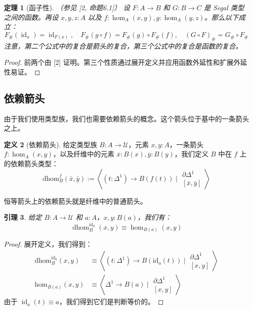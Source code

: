 \documentclass{ctexrep}
\theoremstyle{plain}
\newtheorem{theorem}{定理}[section]
\newtheorem{lemma}[theorem]{引理}
\theoremstyle{definition}
\newtheorem{definition}[theorem]{定义}
\theoremstyle{remark}
\theoremstyle{definition}
\theoremstyle{definition}
\theoremstyle{definition}
\newcommand{\id}{\operatorname{id}}
\newcommand{\UU}{\mathcal{U}}
\newcommand{\dhom}{\operatorname{dhom}}
\begin{document}
\begin{theorem}[函子性]（参见 [2, 命题6.1]）
设 $F:A\to B$ 和 $G:B\to C$ 是 Segal 类型之间的函数。再设 $x,y,z:A$ 以及 $f:\hom_A(x,y), g:\hom_A(y,z)$。那么以下成立：
\[
F_{\#}(\id_x) = \id_{F(x)}, \quad F_{\#}(g\circ f) = F_{\#}(g)\circ F_{\#}(f), \quad (G\circ F)_{\#} = G_{\#}\circ F_{\#}
\]
注意，第二个公式中的复合是箭头的复合，第三个公式中的复合是函数的复合。
\end{theorem}

\begin{proof}
前两个由 [2] 证明。第三个性质通过展开定义并应用函数外延性和扩展外延性易证。
\end{proof}

\subsection{依赖箭头}

由于我们使用类型族，我们也需要依赖箭头的概念。这个箭头位于基中的一条箭头之上。

\begin{definition}[依赖箭头]
给定类型族 $B:A\to\UU$，元素 $x,y:A$，一条箭头 $f:\hom_A(x,y)$，以及纤维中的元素 $\overline{x}:B(x),\overline{y}:B(y)$，我们定义 $B$ 中在 $f$ 上的依赖箭头类型：
\[
\text{dhom}_B^f(\bar{x}, \bar{y}) := \left\langle (t : \Delta^1) \to B(f(t)) \mid \begin{smallmatrix} \partial \Delta^1 \\ [\bar{x}, \bar{y}] \end{smallmatrix} \right\rangle
\]
\end{definition}

恒等箭头上的依赖箭头就是纤维中的普通箭头。

\begin{lemma}
给定 $B:A\to\UU$ 和 $a:A$，$x,y:B(a)$，我们有：
\[
\dhom_B^{\text{id}_a}(x, y) \equiv \hom_{B(a)}(x, y)
\]
\end{lemma}

\begin{proof}
展开定义，我们得到：
\begin{align*}
\text{dhom}_B^{\text{id}_a}(x, y) &\equiv \left\langle (t : \Delta^1) \to B(\text{id}_a(t)) \mid \begin{smallmatrix} \partial \Delta^1 \\ [x, y] \end{smallmatrix} \right\rangle \\
\text{hom}_{B(a)}(x, y) &\equiv \left\langle \Delta^1 \to B(a) \mid \begin{smallmatrix} \partial \Delta^1 \\ [x, y] \end{smallmatrix} \right\rangle
\end{align*}
由于 $\id_a(t)\equiv a$，我们得到它们是判断等价的。
\end{proof}
\end{document}
